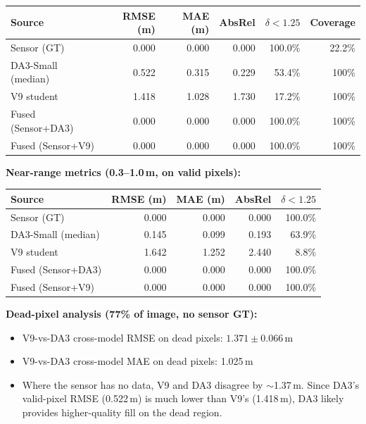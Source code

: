 \documentclass[11pt,a4paper]{article}
\begin{document}
\begin{center}
\footnotesize
\begin{tabular}{lrrrrr}
\toprule
\textbf{Source} & \textbf{RMSE (m)} & \textbf{MAE (m)}
  & \textbf{AbsRel} & \textbf{$\delta{<}1.25$} & \textbf{Coverage} \\
\midrule
Sensor (GT)         & 0.000 & 0.000 & 0.000 & 100.0\% & 22.2\% \\
DA3-Small (median)  & 0.522 & 0.315 & 0.229 &  53.4\% & 100\% \\
V9 student          & 1.418 & 1.028 & 1.730 &  17.2\% & 100\% \\
Fused (Sensor+DA3)  & 0.000 & 0.000 & 0.000 & 100.0\% & 100\% \\
Fused (Sensor+V9)   & 0.000 & 0.000 & 0.000 & 100.0\% & 100\% \\
\bottomrule
\end{tabular}
\end{center}

\textbf{Near-range metrics (0.3--1.0\,m, on valid pixels):}

\begin{center}
\footnotesize
\begin{tabular}{lrrrr}
\toprule
\textbf{Source} & \textbf{RMSE (m)} & \textbf{MAE (m)}
  & \textbf{AbsRel} & \textbf{$\delta{<}1.25$} \\
\midrule
Sensor (GT)         & 0.000 & 0.000 & 0.000 & 100.0\% \\
DA3-Small (median)  & 0.145 & 0.099 & 0.193 &  63.9\% \\
V9 student          & 1.642 & 1.252 & 2.440 &   8.8\% \\
Fused (Sensor+DA3)  & 0.000 & 0.000 & 0.000 & 100.0\% \\
Fused (Sensor+V9)   & 0.000 & 0.000 & 0.000 & 100.0\% \\
\bottomrule
\end{tabular}
\end{center}

\textbf{Dead-pixel analysis (77\% of image, no sensor GT):}
\begin{itemize}
  \item V9-vs-DA3 cross-model RMSE on dead pixels:
    $1.371 \pm 0.066$\,m
  \item V9-vs-DA3 cross-model MAE on dead pixels: 1.025\,m
  \item Where the sensor has no data, V9 and DA3 disagree by
    $\sim$1.37\,m.  Since DA3's valid-pixel RMSE (0.522\,m) is much
    lower than V9's (1.418\,m), DA3 likely provides higher-quality
    fill on the dead region.
\end{itemize}
\end{document}

